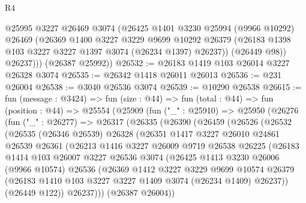 \begin{lexlean}{R4}
\begin{coremodule}
            @25995
            @3227
            @26469
            @3074
            (@26425
              @1401
              @3230
              @25994
              (@9966 @10292)
              @26469
              (@26369
                @1400
                @3227
                @3229
                @9699
                @10292
                @26379
                (@26183 @1398 @103 @3227 @3227 @1397 @3074 (@26234 @1397) @26237))
              (@26449 @98))
            @26237)))
      (@26387 @25992))
@26532 := @26183 @1419 @103 @26014 @3227 @26328 @3074
@26535 := @26342 @1418 @26011 @26013
@26536 := @231 @26004
@26538 := @3040 @26536 @3074
@26539 := @10290 @26538
@26615 := fun (message : @3424) =>
  fun (size : @44) =>
  fun (total : @44) =>
  fun (position : @44) =>
  @25554
    (@25909
      (fun ("_" : @25910) =>
      @25950
        (@26276
          (fun ("_" : @26277) =>
          @26317
            (@26335
              (@26390
                (@26459
                  (@26526
                    (@26532
                      (@26535
                        (@26346 @26539)
                        @26328
                        (@26351
                          @1417
                          @3227
                          @26010
                          @24861
                          @26539
                          @26361
                          (@26213
                            @1416
                            @3227
                            @26009
                            @9719
                            @26538
                            @26225
                            (@26183
                              @1414
                              @103
                              @26007
                              @3227
                              @26536
                              @3074
                              (@26425
                                @1413
                                @3230
                                @26006
                                (@9966 @10574)
                                @26536
                                (@26369
                                  @1412
                                  @3227
                                  @3229
                                  @9699
                                  @10574
                                  @26379
                                  (@26183 @1410 @103 @3227 @3227 @1409 @3074 (@26234 @1409) @26237))
                                (@26449 @122))
                              @26237)))
                        (@26387 @26004))

\end{coremodule}
\end{lexlean}
